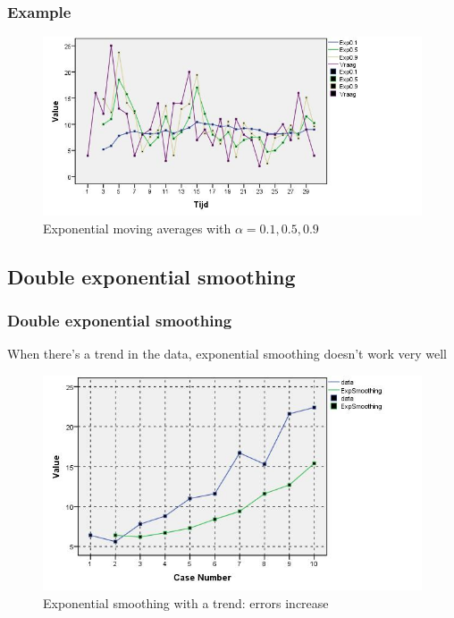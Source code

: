 \documentclass{beamer}
\begin{document}
\begin{frame}
  \frametitle{Example}
  \begin{figure}[htbp]
    \centering
    \includegraphics[width=\textwidth]{img/tijdreeks51}
    \caption{Exponential moving averages with $\alpha=0.1 , 0.5, 0.9$}
    \label{fig:tijdreeks51}
  \end{figure}
\end{frame}

\subsection{Double exponential smoothing}

\begin{frame}
  \frametitle{Double exponential smoothing}

  When there's a trend in the data, exponential smoothing doesn't work very well
  
  \begin{figure}
    \centering
    \includegraphics[width=.7\textwidth]{img/tijdreeks61}
    \caption{Exponential smoothing with a trend: errors increase}
    \label{fig:tijdreeks61}
  \end{figure}

\end{frame}
\end{document}
